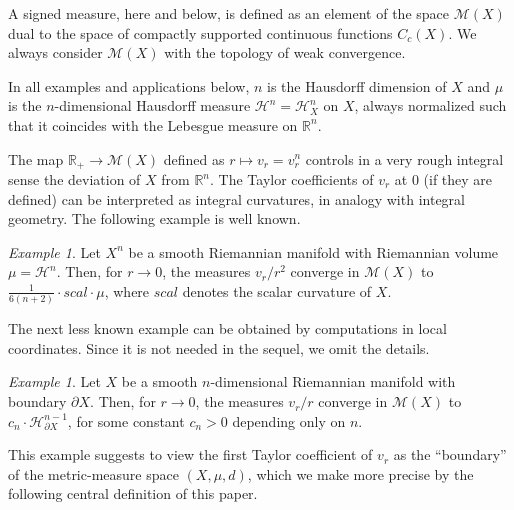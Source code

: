 \documentclass[12pt,leqno,intlimits]{amsart}
\numberwithin{equation}{section}
\theoremstyle{definition}
\theoremstyle{remark}
\newtheorem{ex}[thm]{Example}
\newcommand{\R}{\mathbb{R}}
\begin{document}
A signed measure, here and below, is defined  as an element of the space $\mathcal M(X)$ dual to the space of compactly supported continuous functions $C_c (X)$.
We always consider $\mathcal M(X)$ with the topology of weak convergence.

In all examples and applications below,  $n$  is the Hausdorff dimension of $X$ and $\mu$ is the $n$-dimensional Hausdorff measure $\mathcal H^n =\mathcal H^n _X$ on $X$, always normalized such that it coincides with the Lebesgue measure on $\R^n$.


The map $\mathbb{R}_+\to\mathcal M(X)$ defined as $r\mapsto  v_r=v_r ^n$ controls in a very rough integral sense the deviation of $X$ from $\R^n$.
The Taylor coefficients of $v_r$ at $0$ (if they are defined) can be interpreted as integral curvatures, in analogy with integral geometry. The following  example is well known.



    \begin{ex} \label{smoothscal}
 Let $X^n$ be a  smooth Riemannian manifold with  Riemannian volume $\mu =\mathcal H^n$.  Then, for $r\to 0$,
  the measures $v_r /r^2$ converge in $\mathcal M(X)$ to $\frac 1 {6(n+2)}\cdot scal \cdot \mu$, where
  $scal$ denotes the scalar curvature of $X$.
\end{ex}



The next less known example can be obtained by computations in local coordinates. Since it is not needed in the sequel, we omit
  the details.




  \begin{ex} \label{mainex}
Let $X$ be a smooth $n$-dimensional Riemannian manifold with boundary $\partial X$.
Then, for $r\to 0$, the measures   $v_r/r$  converge in $\mathcal M(X)$ to
$c_n \cdot \mathcal H^{n-1} _{\partial X}$, for some constant $c_n >0$ depending only on $n$.
\end{ex}

This example  suggests  to view the first Taylor coefficient of $v_r$   as the ``boundary'' of the metric-measure space $(X,\mu,d)$,
 which we make more precise by the following central definition of this paper.
\end{document}
